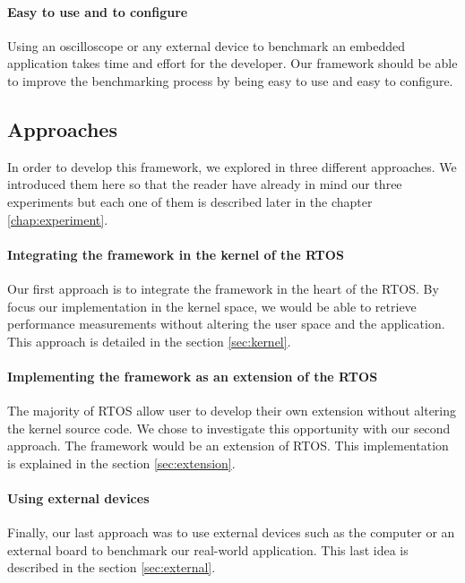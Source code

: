 \paragraph{Easy to use and to configure}
Using an oscilloscope or any external device to benchmark an embedded application takes time and effort for the developer.
Our framework should be able to improve the benchmarking process by being easy to use and easy to configure.

\subsection{Approaches}

In order to develop this framework, we explored in three different approaches.
We introduced them here so that the reader have already in mind our three experiments but each one of them is described later in the chapter \ref{chap:experiment}.

\paragraph{Integrating the framework in the kernel of the RTOS}
Our first approach is to integrate the framework in the heart of the RTOS.
By focus our implementation in the kernel space, we would be able to retrieve performance measurements without altering the user space and the application.
This approach is detailed in the section \ref{sec:kernel}.

\paragraph{Implementing the framework as an extension of the RTOS}
The majority of RTOS allow user to develop their own extension without altering the kernel source code.
We chose to investigate this opportunity with our second approach.
The framework would be an extension of RTOS.
This implementation is explained in the section \ref{sec:extension}.

\paragraph{Using external devices}
Finally, our last approach was to use external devices such as the computer or an external board to benchmark our real-world application.
This last idea is described in the section \ref{sec:external}.
